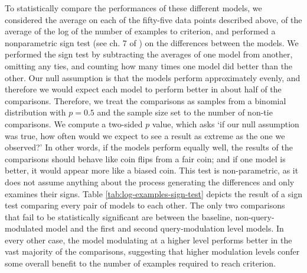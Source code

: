 To statistically compare the performances of these different models, we considered the average on each of the fifty-five data points described above, of the average of the log of the number of examples to criterion, and performed a nonparametric sign test (see ch. 7 of \cite{Kvam2007}) on the differences between the models. We performed the sign test by subtracting the averages of one model from another, omitting any ties, and counting how many times one model did better than the other. Our null assumption is that the models perform approximately evenly, and therefore we would expect each model to perform better in about half of the comparisons. Therefore, we treat the comparisons as samples from a binomial distribution with $p = 0.5$ and the sample size set to the number of non-tie comparisons. We compute a two-sided $p$ value, which asks `if our null assumption was true, how often would we expect to see a result as extreme as the one we observed?' In other words, if the models perform equally well, the results of the comparisons should behave like coin flips from a fair coin; and if one model is better, it would appear more like a biased coin. This test is non-parametric, as it does not assume anything about the process generating the differences and only examines their signs. Table \ref{tab:log-examples-sign-test} depicts the result of a sign test comparing every pair of models to each other. The only two comparisons that fail to be statistically significant are between the baseline, non-query-modulated model and the first and second query-modulation level models. In every other case, the model modulating at a higher level performs better in the vast majority of the comparisons, suggesting that higher modulation levels confer some overall benefit to the number of examples required to reach criterion. 

